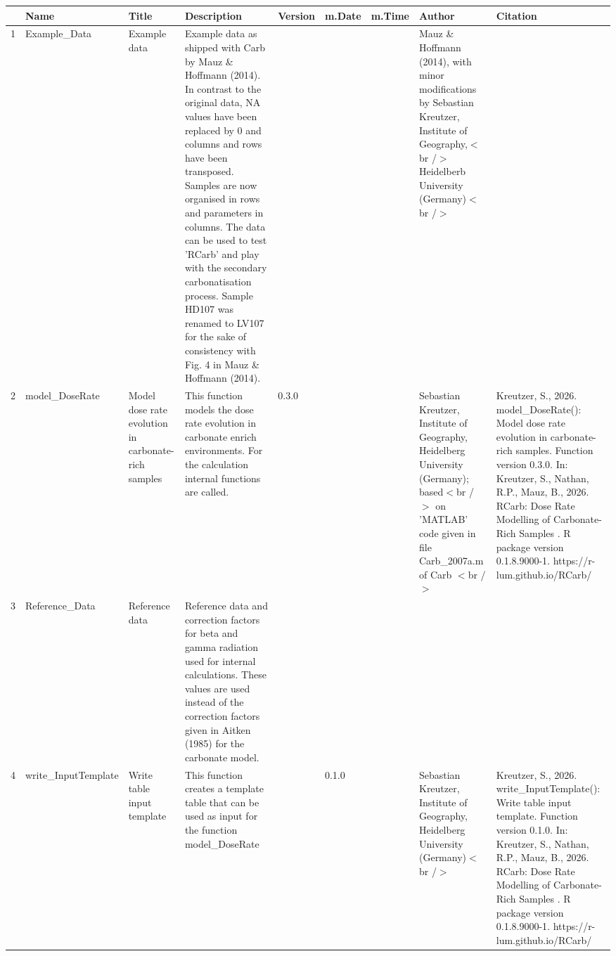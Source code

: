 \begin{table}[ht]
\centering
\begin{tabular}{rllllllll}
  \hline
 & Name & Title & Description & Version & m.Date & m.Time & Author & Citation \\ 
  \hline
1 & Example\_Data & Example data & Example data as shipped with  Carb  by Mauz \& Hoffmann (2014). In contrast to the original data,  NA  values have been replaced by 0 and columns and rows have been transposed. Samples are now organised in rows and parameters in columns.  The data can be used to test  'RCarb'  and play with the secondary carbonatisation process. Sample HD107 was renamed to LV107 for the sake of consistency with Fig. 4 in Mauz \& Hoffmann (2014). &  &  &  & Mauz \& Hoffmann (2014), with minor modifications by Sebastian Kreutzer, Institute of Geography,$<$br /$>$ Heidelberb University (Germany)$<$br /$>$ &  \\ 
  2 & model\_DoseRate & Model dose rate evolution in carbonate-rich samples & This function models the dose rate evolution in carbonate enrich environments. For the calculation internal functions are called. & 0.3.0
 &  &  & Sebastian Kreutzer, Institute of Geography, Heidelberg University (Germany); based$<$br /$>$ on 'MATLAB' code given in file Carb\_2007a.m of  Carb $<$br /$>$ & Kreutzer, S., 2026. model\_DoseRate(): Model dose rate evolution in carbonate-rich samples. Function version 0.3.0. In: Kreutzer, S., Nathan, R.P., Mauz, B., 2026. RCarb: Dose Rate Modelling of Carbonate-Rich Samples . R package version 0.1.8.9000-1. https://r-lum.github.io/RCarb/
 \\ 
  3 & Reference\_Data & Reference data & Reference data and correction factors for beta and gamma radiation used for internal calculations. These values are used instead of the correction factors given in Aitken (1985) for the carbonate model. &  &  &  &  &  \\ 
  4 & write\_InputTemplate & Write table input template & This function creates a template table that can be used as input for the function model\_DoseRate &  & 0.1.0
 &  & Sebastian Kreutzer, Institute of Geography, Heidelberg University (Germany)$<$br /$>$ & Kreutzer, S., 2026. write\_InputTemplate(): Write table input template. Function version 0.1.0. In: Kreutzer, S., Nathan, R.P., Mauz, B., 2026. RCarb: Dose Rate Modelling of Carbonate-Rich Samples . R package version 0.1.8.9000-1. https://r-lum.github.io/RCarb/
 \\ 
   \hline
\end{tabular}
\end{table}

